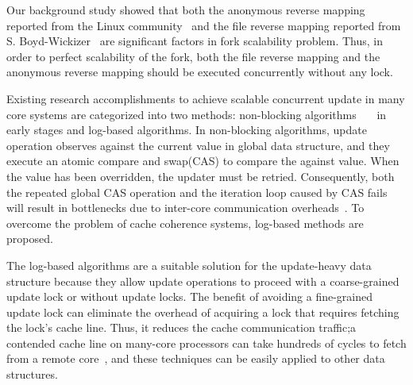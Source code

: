 Our background study showed that both the anonymous reverse mapping
reported from the Linux community~\cite{Andi2011adding} and the file reverse mapping reported from S.
Boyd-Wickizer~\cite{SilasBoydWickizerPth} are significant factors in fork scalability problem.
Thus, in order to perfect scalability of the fork, both the
file reverse mapping and the anonymous reverse mapping should be executed
concurrently without any lock.


Existing research accomplishments to achieve scalable concurrent update in many
core systems are categorized into two methods:
non-blocking
algorithms~\cite{Harris2001Lockfree}~\cite{Fomitchev2004Lockfree}~\cite{Timnat2012}
in early stages and log-based algorithms.
In non-blocking algorithms, update operation observes against the current
value in global data structure, and they execute an atomic compare and swap(CAS) to 
compare the against value.
When the value has been overridden, the updater must be retried.
Consequently, both the repeated global CAS operation and the iteration loop caused
by CAS fails will result in bottlenecks due to inter-core communication
overheads~\cite{SilasBoydWickizerPth}.
To overcome the problem of cache coherence systems, log-based methods are
proposed.



The log-based algorithms are
a suitable solution for the update-heavy data structure because they allow
update operations to proceed with a coarse-grained update lock or without
update locks.
The benefit of avoiding a fine-grained update lock can eliminate the overhead of
acquiring a lock that requires fetching the lock's cache line.
Thus, it reduces the cache communication traffic;a contended cache line on
many-core processors can take hundreds of cycles to fetch from a remote
core~\cite{AustinTClements2012RCUBalancedTrees}, and these techniques can be easily applied to other data structures.

